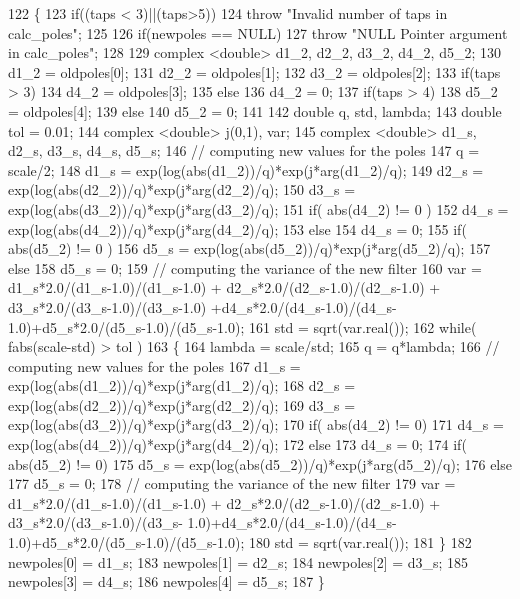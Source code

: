 \begin{DoxyCode}
122 \{
123     \textcolor{keywordflow}{if}((taps < 3)||(taps>5))
124         \textcolor{keywordflow}{throw} \textcolor{stringliteral}{"Invalid number of taps in calc\_poles"};
125     
126     \textcolor{keywordflow}{if}(newpoles == NULL)
127         \textcolor{keywordflow}{throw} \textcolor{stringliteral}{"NULL Pointer argument in calc\_poles"};
128 
129     complex <double> d1\_2, d2\_2, d3\_2, d4\_2, d5\_2;
130     d1\_2 = oldpoles[0];
131     d2\_2 = oldpoles[1];
132     d3\_2 = oldpoles[2];
133     \textcolor{keywordflow}{if}(taps > 3)
134         d4\_2 = oldpoles[3];
135     \textcolor{keywordflow}{else}
136         d4\_2 = 0;
137     \textcolor{keywordflow}{if}(taps > 4)
138         d5\_2 = oldpoles[4];
139     \textcolor{keywordflow}{else}
140         d5\_2 = 0;
141     
142     \textcolor{keywordtype}{double} q, std, lambda;
143     \textcolor{keywordtype}{double} tol = 0.01;
144     complex <double> j(0,1), var;
145     complex <double> d1\_s, d2\_s, d3\_s, d4\_s, d5\_s;
146     \textcolor{comment}{// computing new values for the poles}
147     q = scale/2;
148     d1\_s = exp(log(abs(d1\_2))/q)*exp(j*arg(d1\_2)/q);
149     d2\_s = exp(log(abs(d2\_2))/q)*exp(j*arg(d2\_2)/q);
150     d3\_s = exp(log(abs(d3\_2))/q)*exp(j*arg(d3\_2)/q);
151     \textcolor{keywordflow}{if}( abs(d4\_2) != 0 )
152         d4\_s = exp(log(abs(d4\_2))/q)*exp(j*arg(d4\_2)/q);
153     \textcolor{keywordflow}{else}
154         d4\_s = 0;
155     \textcolor{keywordflow}{if}( abs(d5\_2) != 0 )
156         d5\_s = exp(log(abs(d5\_2))/q)*exp(j*arg(d5\_2)/q);
157     \textcolor{keywordflow}{else}
158         d5\_s = 0;
159     \textcolor{comment}{// computing the variance of the new filter}
160     var =  d1\_s*2.0/(d1\_s-1.0)/(d1\_s-1.0) + d2\_s*2.0/(d2\_s-1.0)/(d2\_s-1.0) + d3\_s*2.0/(d3\_s-1.0)/(d3\_s-1.0)
      +d4\_s*2.0/(d4\_s-1.0)/(d4\_s-1.0)+d5\_s*2.0/(d5\_s-1.0)/(d5\_s-1.0);
161     std = sqrt(var.real());
162     \textcolor{keywordflow}{while}( fabs(scale-std) > tol )
163     \{
164         lambda = scale/std;
165         q = q*lambda;
166         \textcolor{comment}{// computing new values for the poles}
167         d1\_s = exp(log(abs(d1\_2))/q)*exp(j*arg(d1\_2)/q);
168         d2\_s = exp(log(abs(d2\_2))/q)*exp(j*arg(d2\_2)/q);
169         d3\_s = exp(log(abs(d3\_2))/q)*exp(j*arg(d3\_2)/q);
170         \textcolor{keywordflow}{if}( abs(d4\_2) != 0)
171             d4\_s = exp(log(abs(d4\_2))/q)*exp(j*arg(d4\_2)/q);
172         \textcolor{keywordflow}{else}
173             d4\_s = 0;
174         \textcolor{keywordflow}{if}( abs(d5\_2) != 0)
175             d5\_s = exp(log(abs(d5\_2))/q)*exp(j*arg(d5\_2)/q);
176         \textcolor{keywordflow}{else}
177             d5\_s = 0;
178         \textcolor{comment}{// computing the variance of the new filter}
179         var =  d1\_s*2.0/(d1\_s-1.0)/(d1\_s-1.0) + d2\_s*2.0/(d2\_s-1.0)/(d2\_s-1.0) + d3\_s*2.0/(d3\_s-1.0)/(d3\_s-
      1.0)+d4\_s*2.0/(d4\_s-1.0)/(d4\_s-1.0)+d5\_s*2.0/(d5\_s-1.0)/(d5\_s-1.0);
180         std = sqrt(var.real());
181     \}
182     newpoles[0] = d1\_s;
183     newpoles[1] = d2\_s;
184     newpoles[2] = d3\_s;
185     newpoles[3] = d4\_s;
186     newpoles[4] = d5\_s;
187 \}
\end{DoxyCode}


